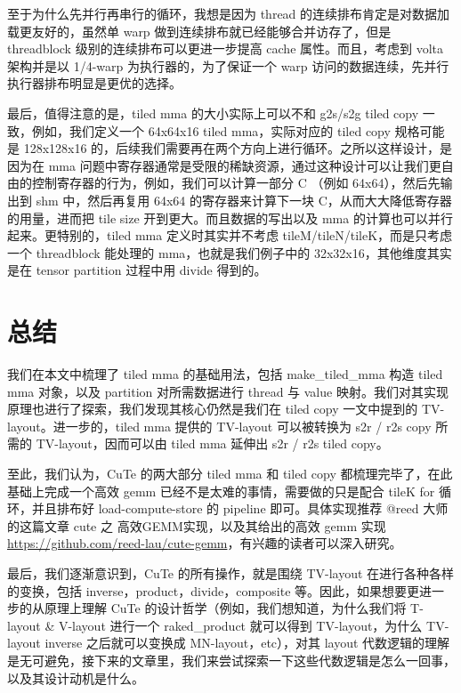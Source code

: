 至于为什么先并行再串行的循环，我想是因为 thread 的连续排布肯定是对数据加载更友好的，虽然单 warp 做到连续排布就已经能够合并访存了，但是 threadblock 级别的连续排布可以更进一步提高 cache 属性。而且，考虑到 volta 架构并是以 1/4-warp 为执行器的，为了保证一个 warp 访问的数据连续，先并行执行器排布明显是更优的选择。

最后，值得注意的是，tiled mma 的大小实际上可以不和 g2s/s2g tiled copy 一致，例如，我们定义一个 64x64x16 tiled mma，实际对应的 tiled copy 规格可能是 128x128x16 的，后续我们需要再在两个方向上进行循环。之所以这样设计，是因为在 mma 问题中寄存器通常是受限的稀缺资源，通过这种设计可以让我们更自由的控制寄存器的行为，例如，我们可以计算一部分 C （例如 64x64），然后先输出到 shm 中，然后再复用 64x64 的寄存器来计算下一块 C，从而大大降低寄存器的用量，进而把 tile size 开到更大。而且数据的写出以及 mma 的计算也可以并行起来。更特别的，tiled mma 定义时其实并不考虑 tileM/tileN/tileK，而是只考虑一个 threadblock 能处理的 mma，也就是我们例子中的 32x32x16，其他维度其实是在 tensor partition 过程中用 divide 得到的。

\section{总结}

我们在本文中梳理了 tiled mma 的基础用法，包括 make\_tiled\_mma 构造 tiled mma 对象，以及 partition 对所需数据进行 thread 与 value 映射。我们对其实现原理也进行了探索，我们发现其核心仍然是我们在 tiled copy 一文中提到的 TV-layout。进一步的，tiled mma 提供的 TV-layout 可以被转换为 s2r / r2s copy 所需的 TV-layout，因而可以由 tiled mma 延伸出 s2r / r2s tiled copy。

至此，我们认为，CuTe 的两大部分 tiled mma 和 tiled copy 都梳理完毕了，在此基础上完成一个高效 gemm 已经不是太难的事情，需要做的只是配合 tileK for 循环，并且排布好 load-compute-store 的 pipeline 即可。具体实现推荐 @reed 大师的这篇文章 cute 之 高效GEMM实现，以及其给出的高效 gemm 实现 \url{https://github.com/reed-lau/cute-gemm}，有兴趣的读者可以深入研究。

最后，我们逐渐意识到，CuTe 的所有操作，就是围绕 TV-layout 在进行各种各样的变换，包括 inverse，product，divide，composite 等。因此，如果想要更进一步的从原理上理解 CuTe 的设计哲学（例如，我们想知道，为什么我们将 T-layout \& V-layout 进行一个 raked\_product 就可以得到 TV-layout，为什么 TV-layout inverse 之后就可以变换成 MN-layout，etc），对其 layout 代数逻辑的理解是无可避免，接下来的文章里，我们来尝试探索一下这些代数逻辑是怎么一回事，以及其设计动机是什么。
